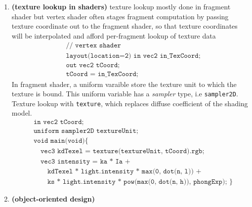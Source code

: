 \documentclass[11pt]{article}
\newcommand{\bheading}[1]{\textbf{(#1)}}
\begin{document}
\begin{enumerate}
    \item \bheading{texture lookup in shaders} texture lookup mostly done in fragment shader but vertex shader often stages fragment computation by passing texture coordinate out to the fragment shader, so that texture coordinates will be interpolated and afford per-fragment lookup of texture data
    \begin{align*}
        &\texttt{// vertex shader} \\
        &\texttt{layout(location=2) in vec2 in\_TexCoord;} \\ 
        &\texttt{out vec2 tCoord;} \\
        &\texttt{tCoord = in\_TexCoord;}
    \end{align*}
    In fragment shader, a uniform varaible store the texture unit to which the texture is bound. This uniform variable has a \textit{sampler} type, i.e \texttt{sampler2D}. Texture lookup with \texttt{texture}, which replaces diffuse coefficient of the shading model.
    \begin{align*}
        &\texttt{in vec2 tCoord;} \\ 
        &\texttt{uniform sampler2D textureUnit;} \\ 
        &\texttt{void main(void)} \{ \\
        &\quad\texttt{vec3 kdTexel = texture(textureUnit, tCoord).rgb;} \\
        &\quad\texttt{vec3 intensity = ka * Ia + } \\
        &\quad\quad\texttt{kdTexel * light.intensity * max(0, dot(n, l)) + } \\ 
        &\quad\quad\texttt{ks * light.intensity * pow(max(0, dot(n, h)), phongExp); }
        \}
    \end{align*}
    \item \bheading{object-oriented design} 
\end{enumerate}

 
 
\end{document}
